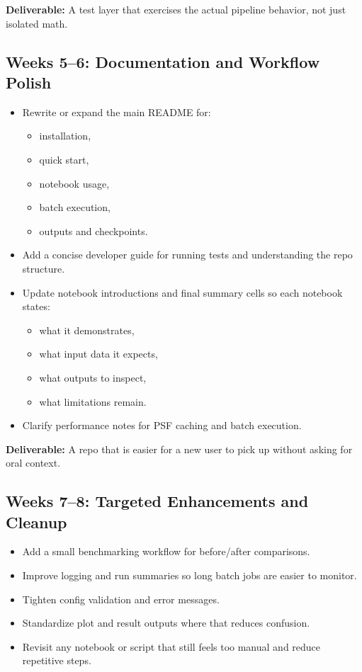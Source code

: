 \documentclass[11pt]{article}
\begin{document}
\noindent\textbf{Deliverable:} A test layer that exercises the actual pipeline behavior, not just isolated math.

\subsection{Weeks 5--6: Documentation and Workflow Polish}

\begin{itemize}
    \item Rewrite or expand the main README for:
    \begin{itemize}
        \item installation,
        \item quick start,
        \item notebook usage,
        \item batch execution,
        \item outputs and checkpoints.
    \end{itemize}
    \item Add a concise developer guide for running tests and understanding the repo structure.
    \item Update notebook introductions and final summary cells so each notebook states:
    \begin{itemize}
        \item what it demonstrates,
        \item what input data it expects,
        \item what outputs to inspect,
        \item what limitations remain.
    \end{itemize}
    \item Clarify performance notes for PSF caching and batch execution.
\end{itemize}

\noindent\textbf{Deliverable:} A repo that is easier for a new user to pick up without asking for oral context.

\subsection{Weeks 7--8: Targeted Enhancements and Cleanup}

\begin{itemize}
    \item Add a small benchmarking workflow for before/after comparisons.
    \item Improve logging and run summaries so long batch jobs are easier to monitor.
    \item Tighten config validation and error messages.
    \item Standardize plot and result outputs where that reduces confusion.
    \item Revisit any notebook or script that still feels too manual and reduce repetitive steps.
\end{itemize}
\end{document}

